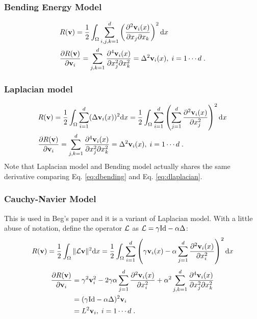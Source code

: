 \documentclass[letterpaper,12pt]{article}
\begin{document}
\subsubsection*{Bending Energy Model}
\begin{align}
& R(\mathbf{v}) = \frac{1}{2} \int_\Omega \sum_{i,j,k=1}^d  
\left( 
\frac{\partial^2 \mathbf{v}_i(x)}{\partial x_j \partial x_k}
\right)^2 \text{d} x 
\\
\label{eq:dbending}
& \frac{\partial R(\mathbf{v})}{\partial \mathbf{v}_i} 
= 
\sum_{j,k=1}^d
\frac{\partial^4 \mathbf{v}_i(x)}{\partial x_j^2 \partial x_k^2}
=
\Delta^2 \mathbf{v}_i(x)
, \; i=1 \cdots d \;. 
\end{align}

\subsubsection*{Laplacian model}
\begin{align}
& R(\mathbf{v}) = \frac{1}{2} \int_\Omega \sum_{i=1}^d (\Delta \mathbf{v}_i(x))^2 \text{d} x
= \frac{1}{2} \int_\Omega \sum_{i=1}^d  
\left( 
\sum_{j=1}^d  
\frac{\partial^2 \mathbf{v}_i(x)}{\partial x_j^2}
\right)^2 \text{d} x 
\\
\label{eq:dlaplacian}
& \frac{\partial R(\mathbf{v})}{\partial \mathbf{v}_i} 
= 
\sum_{j,k=1}^d
\frac{\partial^4 \mathbf{v}_i(x)}{\partial x_j^2 \partial x_k^2}
=
\Delta^2 \mathbf{v}_i(x)
, \; i=1 \cdots d \;. 
\end{align}
Note that Laplacian model and Bending model \cite{Ashburner2007} actually shares the same derivative comparing Eq. \ref{eq:dbending} and Eq. \ref{eq:dlaplacian}.

\subsubsection*{Cauchy-Navier Model}
\label{sec:cauchynaviermodel}

This is used in Beg's paper \cite{Beg2005Computing} and it is a variant of Laplacian model. With a little abuse of notation, define the operator $\mathcal{L}$ as $\mathcal{L} = \gamma \text{Id} - \alpha \Delta$:
\begin{align}
& R(\mathbf{v}) = \frac{1}{2} \int_\Omega \| \mathcal{L} \mathbf{v} \| ^2 \text{d} x
= \frac{1}{2} \int_\Omega \sum_{i=1}^d  
\left(
\gamma \mathbf{v}_i(x) - \alpha \sum_{j=1}^d  \frac{\partial^2 \mathbf{v}_i(x)}{\partial x_i^2}
\right)^2 \text{d} x
\\
\end{align}
\begin{equation}
\label{eq:dBeg}
\begin{split}
\frac{\partial R(\mathbf{v})}{\partial \mathbf{v}_i} 
& = 
\gamma^2 \mathbf{v}_i^2 - 2 \gamma \alpha \sum_{j=1}^d{\frac{\partial^2 \mathbf{v}_i(x)}{\partial x_i^2}} 
+ \alpha^2 \sum_{j,k=1}^d{\frac{\partial^4 \mathbf{v}_i(x)}{\partial x_j^2 \partial x_k^2}} 
\\
& = (\gamma \text{Id} - \alpha \Delta)^2 \mathbf{v}_i \\
& = L^2 \mathbf{v}_i
, \; i=1 \cdots d \;.
\end{split} 
\end{equation}
\end{document}

